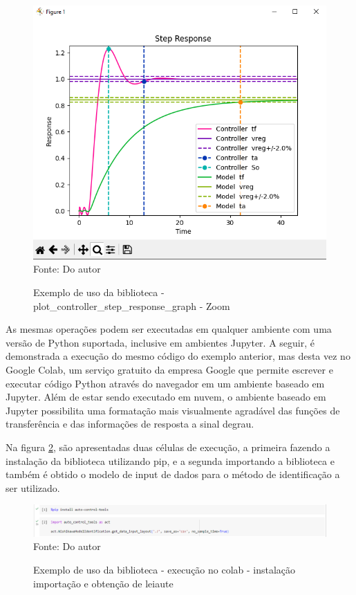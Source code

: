 \begin{figure}[H]
    \centering
    \caption{Exemplo de uso da biblioteca - plot\_controller\_step\_response\_graph - Zoom}
    \includegraphics[scale=0.6]{figuras/get_controller_plot_zoom}
    \label{fig:get_controller_plot_zoom}
    \\
    \vspace{0cm}\hspace{0cm}\small{Fonte: Do autor}
\end{figure}

As mesmas operações podem ser executadas em qualquer ambiente com uma versão de Python suportada, inclusive em
ambientes Jupyter.
A seguir, é demonstrada a execução do mesmo código do exemplo anterior, mas desta vez no Google Colab,
um serviço gratuito da empresa Google que permite escrever e executar código Python através do navegador em um ambiente
baseado em Jupyter.
Além de estar sendo executado em nuvem, o ambiente baseado em Jupyter possibilita uma formatação mais visualmente
agradável das funções de transferência e das informações de resposta a sinal degrau.

Na figura \ref{fig:colab_example1}, são apresentadas duas células de execução, a primeira fazendo a instalação da
biblioteca utilizando pip, e a segunda importando a biblioteca e também é obtido o modelo de input de dados para
o método de identificação a ser utilizado.

\begin{figure}[H]
    \centering
    \caption{Exemplo de uso da biblioteca - execução no colab - instalação importação e obtenção de leiaute}
    \includegraphics[scale=0.5]{figuras/colab_example1}
    \label{fig:colab_example1}
    \\
    \vspace{0cm}\hspace{0cm}\small{Fonte: Do autor}
\end{figure}

